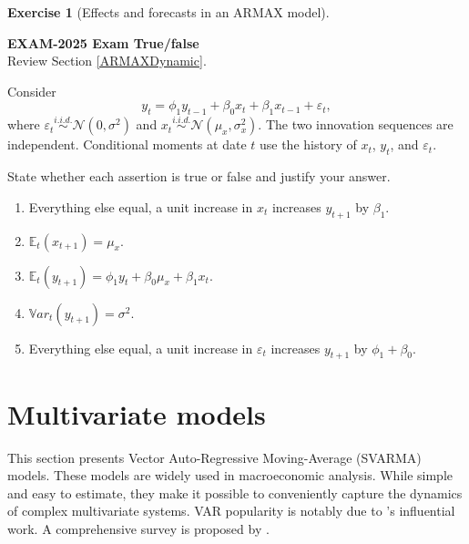 \documentclass[
  11pt,
]{book}
\providecommand{\tightlist}{%
  \setlength{\itemsep}{0pt}\setlength{\parskip}{0pt}}
\theoremstyle{definition}
\theoremstyle{definition}
\theoremstyle{definition}
\newtheorem{exercise}{Exercise}[chapter]
\theoremstyle{definition}
\theoremstyle{remark}
\begin{document}
\begin{exercisebox}

\begin{exercise}[Effects and forecasts in an ARMAX model]
\protect\hypertarget{exr:ex-exam2025-armax-effects-and-forecasts}{}\label{exr:ex-exam2025-armax-effects-and-forecasts}

\textbf{EXAM-2025 \textbar{} Exam \textbar{} True/false}\\
Review Section \ref{ARMAXDynamic}.

Consider
\[
y_t=\phi_1y_{t-1}+\beta_0x_t+\beta_1x_{t-1}+\varepsilon_t,
\]
where \(\varepsilon_t\overset{i.i.d.}{\sim}\mathcal N(0,\sigma^2)\) and \(x_t\overset{i.i.d.}{\sim}\mathcal N(\mu_x,\sigma_x^2)\). The two innovation sequences are independent. Conditional moments at date \(t\) use the history of \(x_t\), \(y_t\), and \(\varepsilon_t\).

State whether each assertion is true or false and justify your answer.

\begin{enumerate}
\def\labelenumi{\arabic{enumi}.}
\tightlist
\item
  Everything else equal, a unit increase in \(x_t\) increases \(y_{t+1}\) by \(\beta_1\).
\item
  \(\mathbb E_t(x_{t+1})=\mu_x\).
\item
  \(\mathbb E_t(y_{t+1})=\phi_1y_t+\beta_0\mu_x+\beta_1x_t\).
\item
  \(\mathbb{V}ar_t(y_{t+1})=\sigma^2\).
\item
  Everything else equal, a unit increase in \(\varepsilon_t\) increases \(y_{t+1}\) by \(\phi_1+\beta_0\).
\end{enumerate}

\end{exercise}

\end{exercisebox}

\chapter{Multivariate models}\label{VAR}

This section presents Vector Auto-Regressive Moving-Average (SVARMA) models. These models are widely used in macroeconomic analysis. While simple and easy to estimate, they make it possible to conveniently capture the dynamics of complex multivariate systems. VAR popularity is notably due to \citet{Sims_1980}'s influential work. A comprehensive survey is proposed by \citet{Stock_Watson_2016}.
\end{document}
